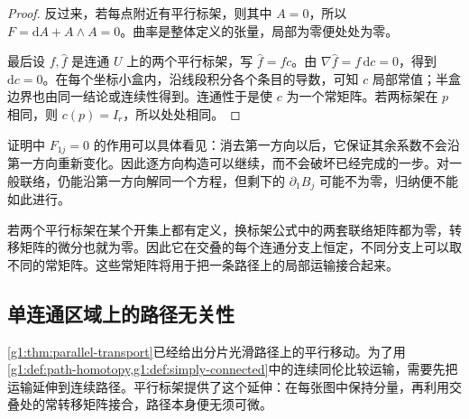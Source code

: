 \begin{proof}
	反过来，若每点附近有平行标架，则其中 \(A=0\)，所以 \(F=\mathrm{d}A+A\wedge A=0\)。曲率是整体定义的张量，局部为零便处处为零。

	最后设 \(f,\widehat f\) 是连通 \(U\) 上的两个平行标架，写 \(\widehat f=f c\)。由 \(\nabla\widehat f=f\,\mathrm{d}c=0\)，得到 \(\mathrm{d}c=0\)。在每个坐标小盒内，沿线段积分各个条目的导数，可知 \(c\) 局部常值；半盒边界也由同一结论或连续性得到。连通性于是使 \(c\) 为一个常矩阵。若两标架在 \(p\) 相同，则 \(c(p)=I_r\)，所以处处相同。
\end{proof}

证明中 \(F_{1j}=0\) 的作用可以具体看见：消去第一方向以后，它保证其余系数不会沿第一方向重新变化。因此逐方向构造可以继续，而不会破坏已经完成的一步。对一般联络，仍能沿第一方向解同一个方程，但剩下的 \(\partial_1B_j\) 可能不为零，归纳便不能如此进行。

\ProseParagraphBreak

若两个平行标架在某个开集上都有定义，换标架公式中的两套联络矩阵都为零，转移矩阵的微分也就为零。因此它在交叠的每个连通分支上恒定，不同分支上可以取不同的常矩阵。这些常矩阵将用于把一条路径上的局部运输接合起来。

\subsection{单连通区域上的路径无关性}
\label{g1:subsec:1505:02}

\cref{g1:thm:parallel-transport}已经给出分片光滑路径上的平行移动。为了用\cref{g1:def:path-homotopy,g1:def:simply-connected}中的连续同伦比较运输，需要先把运输延伸到连续路径。平行标架提供了这个延伸：在每张图中保持分量，再利用交叠处的常转移矩阵接合，路径本身便无须可微。

